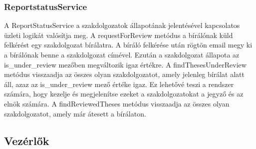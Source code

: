 \subsubsection{ReportstatusService}

A ReportStatusService a szakdolgozatok állapotának jelentésével kapcsolatos üzleti logikát valósítja meg. A requestForReview metódus a bírálónak küld felkérést egy szakdolgozat bírálatra. A bíráló felkérése után rögtön email megy ki a bírálónak benne a szakdolgozat címével. Ezután a szakdolgozat állapota az is\_under\_review mezőben megváltozik igaz értékre. A findThesesUnderReview metódus visszaadja az összes olyan szakdolgozatot, amely jelenleg bírálat alatt áll, azaz az is\_under\_review mező értéke igaz. Ez lehetővé teszi a rendszer számára, hogy kezelje és megjelenítse ezeket a szakdolgozatokat a jegyző és az elnök számára. A findReviewedTheses metódus visszaadja az összes olyan szakdolgozatot, amely már átesett a bírálaton. 


\subsection{Vezérlők}


